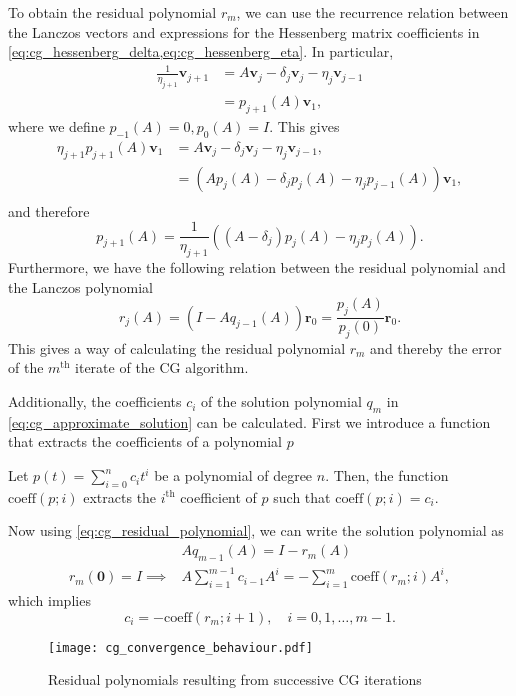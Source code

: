 To obtain the residual polynomial $r_m$, we can use the recurrence relation between the Lanczos vectors and expressions for the Hessenberg matrix coefficients in \cref{eq:cg_hessenberg_delta,eq:cg_hessenberg_eta}. In particular,
\begin{align*}
  \frac{1}{\eta_{j+1}} \mathbf{v}_{j+1} & = A \mathbf{v}_j - \delta_j \mathbf{v}_j - \eta_j \mathbf{v}_{j-1} \\
                                        & = p_{j+1}(A) \mathbf{v}_1,
\end{align*}
where we define $p_{-1}(A) = 0, p_0(A) = I$. This gives
\begin{align*}
  \eta_{j+1}p_{j+1}(A)\mathbf{v}_1 & = A \mathbf{v}_j - \delta_j \mathbf{v}_j - \eta_j \mathbf{v}_{j-1},          \\
                                   & = \left( A p_j(A) - \delta_j p_j(A) - \eta_j p_{j-1}(A) \right)\mathbf{v}_1, \\
\end{align*}
and therefore
\begin{equation}
  p_{j+1}(A) = \frac{1}{\eta_{j+1}}\left( (A - \delta_j )p_j(A) - \eta_j p_{j}(A) \right).
  \label{eq:cg_lanczos_polynomial}
\end{equation}
Furthermore, we have the following relation between the residual polynomial and the Lanczos polynomial \cite[Section 3.2]{Meurant_Strakoš_2006}
\begin{equation}
  r_{j}(A) = (I-Aq_{j-1}(A))\mathbf{r}_0 = \frac{p_{j}(A)}{p_{j}(0)}\mathbf{r}_0.
  \label{eq:cg_residual_polynomial}
\end{equation}
This gives a way of calculating the residual polynomial $r_m$ and thereby the error of the $m^{\text{th}}$ iterate of the CG algorithm.

Additionally, the coefficients $c_i$ of the solution polynomial $q_m$ in \cref{eq:cg_approximate_solution} can be calculated. First we introduce a function that extracts the coefficients of a polynomial $p$
\begin{definition}
  Let $p(t) = \sum_{i=0}^n c_i t^i$ be a polynomial of degree $n$. Then, the function $\text{coeff}(p;i)$ extracts the $i^{\text{th}}$ coefficient of $p$ such that $\text{coeff}(p;i) = c_i$.
\end{definition}
Now using \cref{eq:cg_residual_polynomial}, we can write the solution polynomial as
\begin{align*}
                              & Aq_{m-1}(A) = I - r_m(A)                                                  \\
  r_m(\mathbf{0}) = I\implies & A\sum_{i=1}^{m-1} c_{i-1} A^i = -\sum_{i=1}^{m} \text{coeff}(r_m; i) A^i,
\end{align*}
which implies
\begin{equation}
  c_i = -\text{coeff}(r_m; i+1), \quad i = 0, 1, \dots, m-1.
  \label{eq:cg_solution_coefficients}
\end{equation}
\begin{figure}[H]
  \centering
  \texttt{[image: cg\_convergence\_behaviour.pdf]}
  \caption{Residual polynomials resulting from successive CG iterations}
  \label{fig:cg_convergence_behaviour}
\end{figure}

